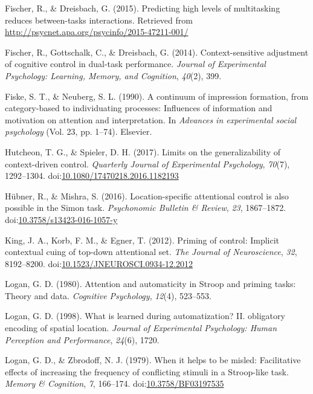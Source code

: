\documentclass[english,,man,floatsintext]{apa6}
\begin{document}
\hypertarget{ref-fischer_predicting_2015}{}
Fischer, R., \& Dreisbach, G. (2015). Predicting high levels of
multitasking reduces between-tasks interactions. Retrieved from
\url{http://psycnet.apa.org/psycinfo/2015-47211-001/}

\hypertarget{ref-fischer_context-sensitive_2014}{}
Fischer, R., Gottschalk, C., \& Dreisbach, G. (2014). Context-sensitive
adjustment of cognitive control in dual-task performance. \emph{Journal
of Experimental Psychology: Learning, Memory, and Cognition},
\emph{40}(2), 399.

\hypertarget{ref-fiske_continuum_1990}{}
Fiske, S. T., \& Neuberg, S. L. (1990). A continuum of impression
formation, from category-based to individuating processes: Influences of
information and motivation on attention and interpretation. In
\emph{Advances in experimental social psychology} (Vol. 23, pp. 1--74).
Elsevier.

\hypertarget{ref-hutcheon_limits_2017}{}
Hutcheon, T. G., \& Spieler, D. H. (2017). Limits on the
generalizability of context-driven control. \emph{Quarterly Journal of
Experimental Psychology}, \emph{70}(7), 1292--1304.
doi:\href{https://doi.org/10.1080/17470218.2016.1182193}{10.1080/17470218.2016.1182193}

\hypertarget{ref-hubner_location-specific_2016}{}
Hübner, R., \& Mishra, S. (2016). Location-specific attentional control
is also possible in the Simon task. \emph{Psychonomic Bulletin \&
Review}, \emph{23}, 1867--1872.
doi:\href{https://doi.org/10.3758/s13423-016-1057-y}{10.3758/s13423-016-1057-y}

\hypertarget{ref-king_priming_2012}{}
King, J. A., Korb, F. M., \& Egner, T. (2012). Priming of control:
Implicit contextual cuing of top-down attentional set. \emph{The Journal
of Neuroscience}, \emph{32}, 8192--8200.
doi:\href{https://doi.org/10.1523/JNEUROSCI.0934-12.2012}{10.1523/JNEUROSCI.0934-12.2012}

\hypertarget{ref-logan_attention_1980}{}
Logan, G. D. (1980). Attention and automaticity in Stroop and priming
tasks: Theory and data. \emph{Cognitive Psychology}, \emph{12}(4),
523--553.

\hypertarget{ref-logan_what_1998}{}
Logan, G. D. (1998). What is learned during automatization? II.
obligatory encoding of spatial location. \emph{Journal of Experimental
Psychology: Human Perception and Performance}, \emph{24}(6), 1720.

\hypertarget{ref-logan_when_1979}{}
Logan, G. D., \& Zbrodoff, N. J. (1979). When it helps to be misled:
Facilitative effects of increasing the frequency of conflicting stimuli
in a Stroop-like task. \emph{Memory \& Cognition}, \emph{7}, 166--174.
doi:\href{https://doi.org/10.3758/BF03197535}{10.3758/BF03197535}
\end{document}
